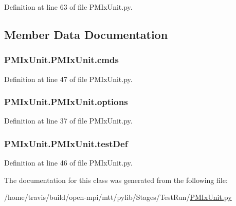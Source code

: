 Definition at line 63 of file P\-M\-Ix\-Unit.\-py.



\subsection{Member Data Documentation}
\hypertarget{class_p_m_ix_unit_1_1_p_m_ix_unit_a1130f07074aeff223235a147440868c4}{
\subsubsection[{cmds}]{\setlength{\rightskip}{0pt plus 5cm}P\-M\-Ix\-Unit.\-P\-M\-Ix\-Unit.\-cmds}}\label{class_p_m_ix_unit_1_1_p_m_ix_unit_a1130f07074aeff223235a147440868c4}


Definition at line 47 of file P\-M\-Ix\-Unit.\-py.

\hypertarget{class_p_m_ix_unit_1_1_p_m_ix_unit_a6c56979e7226a414874653b3e7a17dd8}{
\subsubsection[{options}]{\setlength{\rightskip}{0pt plus 5cm}P\-M\-Ix\-Unit.\-P\-M\-Ix\-Unit.\-options}}\label{class_p_m_ix_unit_1_1_p_m_ix_unit_a6c56979e7226a414874653b3e7a17dd8}


Definition at line 37 of file P\-M\-Ix\-Unit.\-py.

\hypertarget{class_p_m_ix_unit_1_1_p_m_ix_unit_a08b01eaf2867a0a02f8598018739e843}{
\subsubsection[{test\-Def}]{\setlength{\rightskip}{0pt plus 5cm}P\-M\-Ix\-Unit.\-P\-M\-Ix\-Unit.\-test\-Def}}\label{class_p_m_ix_unit_1_1_p_m_ix_unit_a08b01eaf2867a0a02f8598018739e843}


Definition at line 46 of file P\-M\-Ix\-Unit.\-py.



The documentation for this class was generated from the following file\-:\begin{DoxyCompactItemize}
\item 
/home/travis/build/open-\/mpi/mtt/pylib/\-Stages/\-Test\-Run/\hyperlink{_p_m_ix_unit_8py}{P\-M\-Ix\-Unit.\-py}\end{DoxyCompactItemize}
